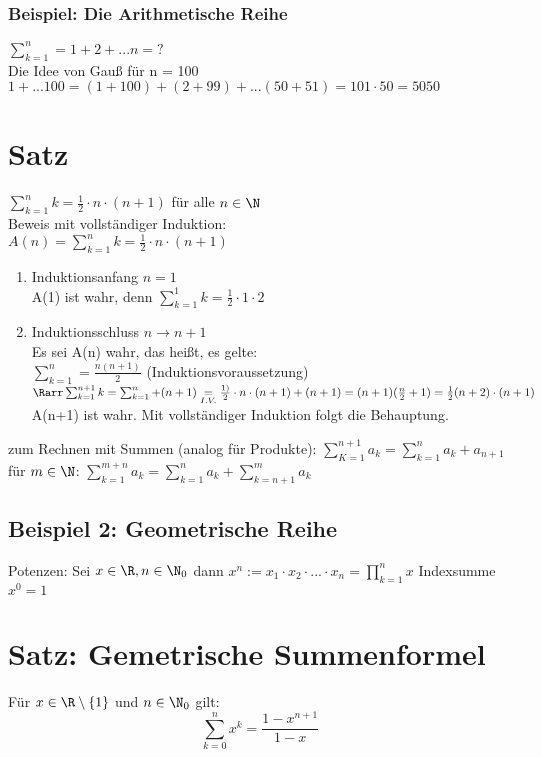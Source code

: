 \subsubsection*{Beispiel: Die Arithmetische Reihe}
$\sum_{k = 1}^{n} = 1 + 2 + ... n = ?$\\
Die Idee von Gauß für n = 100\\
$1 + ... 100 = (1 + 100) + (2 + 99) + ... (50 + 51) = 101 \cdot 50 = 5050$\\
\section{Satz}
$\sum_{k=1}^{n} k = \frac{1}{2} \cdot n \cdot (n+1)$ für alle $n \in \N$\\
Beweis mit vollständiger Induktion:\\
$A(n) = \sum_{k=1}^{n} k = \frac{1}{2} \cdot n \cdot (n + 1)$
\begin{enumerate}
\item Induktionsanfang $n = 1$\\
A(1) ist wahr, denn $\sum_{k=1}^{1} k = \frac{1}{2} \cdot 1 \cdot 2$ \ok
\item Induktionsschluss $n \to n + 1$\\
Es sei A(n) wahr, das heißt, es gelte:\\
$\sum_{k = 1}^{n} = \frac{n (n+1)}{2}$ (Induktionsvoraussetzung)\\
$\Rarr \sum_{k = 1}^{n + 1} k = \sum_{k = 1}^{n} + (n + 1) \underset{I.V.}{=} \frac{1)}{2} \cdot n \cdot (n+1) + (n+1) = (n+1)(\frac{n}{2} + 1) = \frac{1}{2} (n+2) \cdot (n+1)$
\Rarr A(n+1) ist wahr. Mit vollständiger Induktion folgt die Behauptung.
\end{enumerate}
\bem zum Rechnen mit Summen (analog für Produkte):
$\sum_{K = 1}^{n + 1} a_k = \sum_{k = 1}^{n} a_k + a_{n+1}$\\
für $m \in \N$: $\sum_{k=1}^{m+n} a_k = \sum_{k = 1}^{n} a_k + \sum_{k = n + 1}^{m} a_k$
\subsection*{Beispiel 2: Geometrische Reihe}
Potenzen: Sei $x\in \R, n \in \N_0$ dann $x^n := x_1 \cdot x_2 \cdot ... \cdot x_n = \prod_{k=1}^{n} x$
Indexsumme $x^0 = 1$
\section{Satz: Gemetrische Summenformel}
Für $x \in \R\setminus \{1\}$ und $n \in \N_0$ gilt:
$$\sum_{k = 0}^{n} x^k = \frac{1 - x^{n+1}}{1 - x}$$
